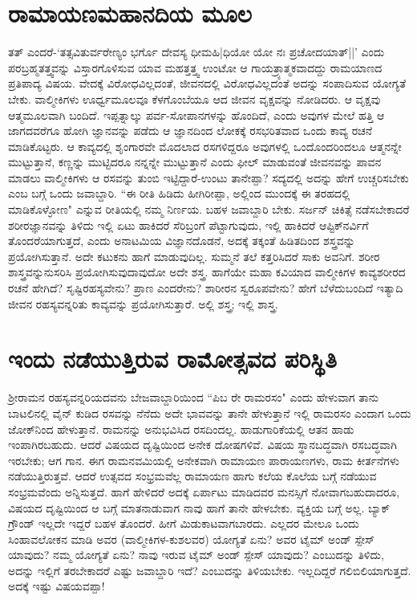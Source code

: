 \section*{ರಾಮಾಯಣಮಹಾನದಿಯ ಮೂಲ} 

ತತ್‍ ಎಂದರೆ-`ತತ್ಸವಿತುರ್ವರೇಣ್ಯಂ\label{186} ಭರ್ಗೊ ದೇವಸ್ಯ ಧೀಮಹಿ|ಧಿಯೋ ಯೋ ನಃ ಪ್ರಚೋದಯಾತ್‍||' ಎಂದು ಪರಬ್ರಹ್ಮತತ್ತ್ವವನ್ನು ವಿಸ್ತಾರಗೊಳಿಸುವ ಯಾವ ಮಹತ್ತತ್ತ್ವ ಉಂಟೋ ಆ ಗಾಯತ್ರ್ಯಾತ್ಮಕವಾದದ್ದು ರಾಮಯಾಣದ ಪ್ರತಿಪಾದ್ಯ ವಿಷಯ. ವೇದಕ್ಕೆ ವಿರೋಧವಿಲ್ಲದಂತೆ, ಜೀವನದಲ್ಲಿ ವಿರೋಧವಿಲ್ಲದಂತೆ ಅದನ್ನು ಸಂಪಾದಿಸುವ ಯೋಗ್ಯತೆ ಬೇಕು. ವಾಲ್ಮೀಕಿಗಳು ಊರ್ಧ್ವಮೂಲವೂ ಕೆಳಗೊಂಬೆಯೂ ಆದ ಜೀವನ ವೃಕ್ಷವನ್ನು ನೋಡಿದರು. ಆ ವೃಕ್ಷವು ಆತ್ಮಮೂಲವಾಗಿ ಬಂದಿದೆ. ಇಪ್ಪತ್ನಾಲ್ಕು ಪರ್ವ-ಸೋಪಾನಗಳನ್ನು ಹೊಂದಿದೆ, ಎಂದು ಅವುಗಳ ಮೇಲೆ ಹತ್ತಿ ಆ ಜಾಗದವರೆಗೂ ಹೋಗಿ ಜ್ಞಾನವನ್ನು ಪಡೆದು ಆ ಜ್ಞಾನದಿಂದ ಲೋಕಕ್ಕೆ ರಸಭರಿತವಾದ ಒಂದು ಕಾವ್ಯ ರಚನೆ ಮಾಡಿಕೊಟ್ಟರು. ಆ ಕಾವ್ಯದಲ್ಲಿ ಶೃಂಗಾರವೇ ಮೊದಲಾದ ರಸಗಳಿದ್ದರೂ ಅವುಗಳಲ್ಲಿ ಒಂದೊಂದರಿಂದಲೂ ಆತ್ಮನನ್ನೇ ಮುಟ್ಟುತ್ತಾನೆ, ಕಣ್ಣನ್ನು ಮುಟ್ಟಿದರೂ ನನ್ನನ್ನೇ ಮುಟ್ಟುತ್ತಾನೆ ಎಂದು ಫೀಲ್‍ ಮಾಡುವಂತೆ ಜೀವನವನ್ನು ಪಾವನ ಮಾಡಲು ವಾಲ್ಮೀಕಿಗಳು ಆ ರಸವನ್ನು ತುಂಬಿ ಇಟ್ಟಿದ್ದಾರೆ-ಉಂಟು ತಾನೇಪ್ಪಾ? ಸದ್ಯದಲ್ಲಿ ಅದನ್ನು ಹೇಗೆ ಉಚ್ಚರಿಸಬೇಕು ಎಂಬ ಬಗ್ಗೆ ಒಂದು ಜವಾಬ್ದಾರಿ. ``ಈ ರೀತಿ ಹಿಡಿದು ಹೀಗಿರೀಪ್ಪಾ, ಅಲ್ಲಿಂದ ಮುಂದಕ್ಕೆ ಈ ತರಹದಲ್ಲಿ ಮಾಡಿಕೊಳ್ಳೋಣ" ಎನ್ನುವ ರೀತಿಯಲ್ಲಿ ನಮ್ಮ ನಿರ್ಣಯ. ಬಹಳ ಜವಾಬ್ದಾರಿ ಬೇಕು. ಸರ್ಜನ್‍ ಚಿಕಿತ್ಸೆ ನಡೆಸಬೇಕಾದರೆ ಶರೀರಜ್ಞಾನವನ್ನು ತಿಳಿದು ಇಲ್ಲಿ ಏಟು ಹಾಕಿದರೆ ಸೆರಿಬ್ರಂಗೆ ಪೆಟ್ಟಾಗುವುದು, ಇಲ್ಲಿ ಹಾಕಿದರೆ ಆಪ್ಟಿಕ್‍ನರ್ವಿಗೆ ತೊಂದರೆಯಾಗುತ್ತದೆ, ಎಂದು ಅನಾಟಮಿಯ ವಿಜ್ಞಾನದೊಡನೆ, ಅದಕ್ಕೆ ತಕ್ಕಂತೆ ಹಿಡಿತದಿಂದ ಶಸ್ತ್ರವನ್ನು ಪ್ರಯೋಗಿಸುತ್ತಾನೆ. ಅದೇ ಕಟುಕನು ಹಾಗೆ ಮಾಡುವುದಿಲ್ಲ. ಸುಮ್ಮನೆ ತಲೆ ಕತ್ತರಿಸಿದರೆ ಸಾಕು ಅವನಿಗೆ. ಶರೀರ ಶಾಸ್ತ್ರವನ್ನುನುಸರಿಸಿ ಪ್ರಯೋಗಿಸುವುದಾವುದೋ ಅದೇ ಶಸ್ತ್ರ. ಹಾಗೆಯೇ ಮಹಾ ಕವಿಯಾದ ವಾಲ್ಮೀಕಿಗಳ ಕಾವ್ಯಶರೀರದ ರಚನೆ ಹೇಗಿದೆ? ಸೃಷ್ಟಿರಹಸ್ಯವೇನು? ಪ್ರಾಣ ಎಂದರೇನು? ಶಾರೀರನ ಸ್ವರೂಪವೇನು? ಹೇಗೆ ಬೆಳೆದುಬಂದಿದೆ ಇತ್ಯಾದಿ ಜೀವನ ರಹಸ್ಯವನ್ನರಿತು ಕಾವ್ಯವನ್ನು ಪ್ರಯೋಗಿಸುತ್ತಾರೆ. ಅಲ್ಲಿ ಶಸ್ತ್ರ; ಇಲ್ಲಿ ಶಾಸ್ತ್ರ. 

\section*{ಇಂದು ನಡೆಯುತ್ತಿರುವ ರಾಮೋತ್ಸವದ ಪರಿಸ್ಥಿತಿ} 

ಶ್ರೀರಾಮನ ರಹಸ್ಯವನ್ನರಿಯದವನು ಬೇಜವಾಬ್ದಾರಿಯಿಂದ ``ಪಿಬ ರೇ ರಾಮರಸಂ"\label{187} ಎಂದು ಹೇಳುವಾಗ ತಾನು ಬಾಟಲಿನಲ್ಲಿ ವೈನ್‍ ಕುಡಿದ ರಸವನ್ನು ನೆನೆದು ಅದೇ ಭಾವವನ್ನು ತಾನೇ ಹೇಳುತ್ತಾನೆ ಇಲ್ಲಿ ರಾಮರಸಂ ಎಂದಾಗ ಒಂದು ಜೋಕ್‍ನಿಂದ ಹೇಳುತ್ತಾನೆ. ರಾಮನನ್ನು ಅನುಭವಿಸಿದ ರಸದಿಂದಲ್ಲ. ಹಾಡುಗಾರಿಕೆಯಲ್ಲಿ ಆತನ ಹಾಡು ಇಂಪಾಗಿರಬಹುದು. ಆದರೆ ವಿಷಯದ ದೃಷ್ಟಿಯಿಂದ ಅನೇಕ ದೋಷಗಳಿವೆ. ವಿಷಯ ಸ್ಥಾನಬದ್ಧವಾಗಿ ರಸಬದ್ಧವಾಗಿ ಇರಬೇಕು; ಆಗ ಗಾನ. ಈಗ ರಾಮನವಮಿಯಲ್ಲಿ ಅನೇಕವಾಗಿ ರಾಮಾಯಣ ಪಾರಾಯಣಗಳು, ರಾಮ ಕೀರ್ತನೆಗಳು ನಡೆಯುತ್ತಿರುತ್ತವೆ. ಆದರೆ ಉತ್ಸವದ ಸಂಭ್ರಮವೆಲ್ಲ ರಾಮಾಯಣ ಹಾಗು ಕಲೆಯ ಕೊಲೆಯ ಬಗ್ಗೆ ನಡೆಯುವ ಸಂಭ್ರಮವೆಂದು ಅನ್ನಿಸುತ್ತದೆ. ಹಾಗೆ ಹೇಳಿದರೆ ಅದಕ್ಕೆ ಏರ್ಪಾಟು ಮಾಡಿದವರ ಮನಸ್ಸಿಗೆ ನೋವಾಗಬಹುದಾದರೂ, ವಿಷಯದ ದೃಷ್ಟಿಯಿಂದ ಆ ಬಗ್ಗೆ ಮಾತನಾಡುವಾಗ ನಾವು ಹಾಗೆ ತಾನೇ ಹೇಳಬೇಕು. ವ್ಯಕ್ತಿಯ ಬಗ್ಗೆ ಅಲ್ಲ. ಬ್ಯಾಕ್‍ ಗ್ರೌಂಡ್‍ ಇಲ್ಲದೇ ಇದ್ದರೆ ಬಹಳ ತೊಂದರೆ. ಹೀಗೆ ಮಿಡುಕಾಟವಾಗಬಾರದು. ಎಲ್ಲದರ ಮೇಲೂ ಒಂದು ಸಿಂಹಾವಲೋಕನ ಮಾಡಿ ಅವರ (ವಾಲ್ಮೀಕಿಗಳ-ಕುಶಲವರ) ಯೋಗ್ಯತೆ ಏನು? ಅವರ ಟೈಮ್‍ ಅಂಡ್‍ ಸ್ಪೇಸ್‍ ಯಾವುದು? ನಮ್ಮ ಯೋಗ್ಯತೆ ಏನು? ನಾವು ಇರುವ ಟೈಮ್‍ ಅಂಡ್‍ ಸ್ಪೇಸ್‍ ಯಾವುದು? ಎಂಬುದನ್ನು ತಿಳಿದು, ಅದನ್ನು ಇಲ್ಲಿಗೆ ತರಬೇಕಾದರೆ ಎಷ್ಟು ಜವಾಬ್ದಾರಿ ಇದೆ? ಎಂಬುದನ್ನು ತಿಳಿಯಬೇಕು. ಇಲ್ಲದಿದ್ದರೆ ಗಲಿಬಿಲಿಯಾಗುತ್ತದೆ. ಅದಕ್ಕೆ ಇಷ್ಟು ವಿಷಯವಪ್ಪಾ! 

